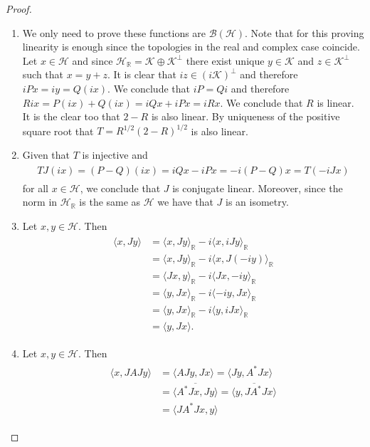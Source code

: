 \begin{proof}
\begin{enumerate}
\item We only need to prove these functions are $\mathcal{B}(\mathcal{H})$. Note that for this proving linearity is enough since the topologies in the real and complex case coincide. Let $x\in\mathcal{H}$ and since $\mathcal{H}_\mathbb{R}=\mathcal{K}\oplus\mathcal{K}^\bot$ there exist unique $y\in\mathcal{K}$ and $z\in\mathcal{K}^\bot$ such that $x=y+z$. It is clear that $iz\in(i\mathcal{K})^\bot$ and therefore $iPx=iy=Q(ix)$. We conclude that $iP=Qi$ and therefore $Rix=P(ix)+Q(ix)=iQx+iPx=iRx$. We conclude that $R$ is linear. It is the clear too that $2-R$ is also linear. By uniqueness of the positive square root that $T=R^{1/2}(2-R)^{1/2}$ is also linear.
\item Given that $T$ is injective and 
\begin{align}
\begin{split}
TJ(ix)=(P-Q)(ix)=iQx-iPx=-i(P-Q)x=T(-iJx)
\end{split}
\end{align}
for all $x\in\mathcal{H}$, we conclude that $J$ is conjugate linear. Moreover, since the norm in $\mathcal{H}_\mathbb{R}$ is the same as $\mathcal{H}$ we have that $J$ is an isometry.
\item Let $x,y\in\mathcal{H}$. Then
\begin{align}
\begin{split}
\langle x,Jy\rangle &= \langle x,Jy\rangle_\mathbb{R}-i\langle x,iJy\rangle_\mathbb{R} \\
&= \langle x,Jy\rangle_\mathbb{R}-i\langle x,J(-iy)\rangle_\mathbb{R} \\
&= \langle Jx,y\rangle_\mathbb{R}-i\langle Jx,-iy\rangle_\mathbb{R} \\
&= \langle y,Jx\rangle_\mathbb{R}-i\langle -iy,Jx\rangle_\mathbb{R} \\
&= \langle y,Jx\rangle_\mathbb{R}-i\langle y,iJx\rangle_\mathbb{R} \\
&= \langle y,Jx \rangle.
\end{split}
\end{align}
\item Let $x,y\in\mathcal{H}$. Then
\begin{align}
\begin{split}
\langle x,JAJy \rangle &= \langle AJy, Jx\rangle = \langle Jy, A^*Jx\rangle \\
&= \overline{\langle A^*Jx,Jy\rangle}=\overline{\langle y, JA^*Jx\rangle} \\
&= \langle JA^*Jx,y\rangle
\end{split}
\end{align}
\end{enumerate}
\end{proof}